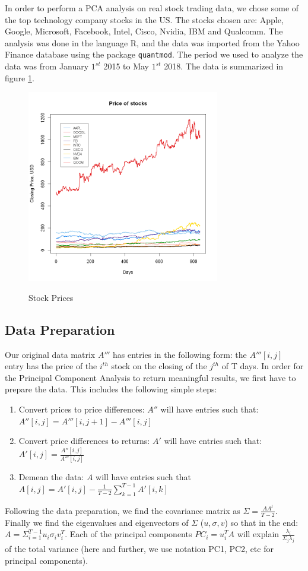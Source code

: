 \documentclass{article}
\begin{document}
In order to perform a PCA analysis on real stock trading data, we chose some of the top technology company stocks in the US. The stocks chosen are: Apple, Google, Microsoft, Facebook, Intel, Cisco, Nvidia, IBM and Qualcomm. The analysis was done in the language R, and the data was imported from the Yahoo Finance database using the package \texttt{quantmod}. The period we used to analyze the data was from January $1^{st}$ 2015 to May $1^{st}$ 2018. The data is summarized in figure \ref{fig:stockprices}.
\begin{figure}[!ht]
\caption{Stock Prices}
\centering
\includegraphics[width=0.75\textwidth]{stock_prices.png}
\label{fig:stockprices}
\end{figure}


\subsection{Data Preparation}
Our original data matrix $A'''$ has entries in the following form: the $A'''[i,j]$ entry has the price of the $i^{th}$ stock on the closing of the $j^{th}$  of T days. In order for the Principal Component Analysis to return meaningful results, we first have to prepare the data. This includes the following simple steps:
\begin{enumerate}
\item Convert prices to price differences:
$A''$ will have entries such that: $A''[i,j] = A'''[i, j+1]-A'''[i,j]$
\item Convert price differences to returns: 
$A'$ will have entries such that: $A'[i,j] = \frac{A''[i,j]}{A'''[i,j]}$
\item Demean the data: 
$A$ will have entries such that $A[i,j] = A'[i,j]-\frac{1}{T-2}\sum_{k=1}^{T-1}A'[i,k]$
\end{enumerate}
Following the data preparation, we find the covariance matrix as $\Sigma = \frac{AA^t}{T-2}$. Finally we find the eigenvalues and eigenvectors of $\Sigma$ ($u, \sigma, v$) so that in the end: $A = \Sigma_{i=1}^{T-1}u_i\sigma_iv_i^T$. Each of the principal components $PC_i = u_i^T A$ will explain $\frac{\lambda_i}{\Sigma_j\lambda_j}$ of the total variance (here and further, we use notation PC1, PC2, etc for principal components).
\end{document}
